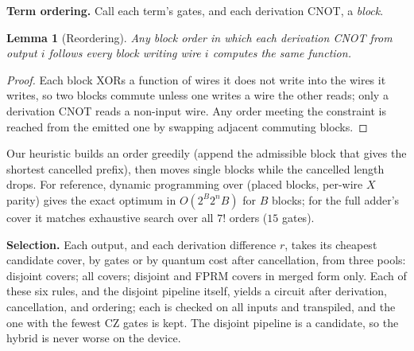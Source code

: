 \documentclass[conference]{IEEEtran}
\theoremstyle{plain}
\newtheorem{lemma}{Lemma}
\begin{document}
\textbf{Term ordering.} Call each term's gates, and each derivation CNOT,
a \emph{block}.
\begin{lemma}[Reordering]
\label{lem:reorder}
Any block order in which each derivation CNOT from output $i$ follows
every block writing wire $i$ computes the same function.
\end{lemma}
\begin{proof}
Each block XORs a function of wires it does not write into the wires it
writes, so two blocks commute unless one writes a wire the other reads;
only a derivation CNOT reads a non-input wire. Any order meeting the
constraint is reached from the emitted one by swapping adjacent
commuting blocks.
\end{proof}
Our heuristic builds an order greedily (append the admissible block that
gives the shortest cancelled prefix), then moves single blocks while the
cancelled length drops. For reference, dynamic programming over
(placed blocks, per-wire $X$ parity) gives the exact optimum in
$O(2^B2^nB)$ for $B$ blocks; for the full adder's cover it matches
exhaustive search over all $7!$ orders ($15$ gates).

\textbf{Selection.} Each output, and each derivation difference $r$,
takes its cheapest candidate cover, by gates or by quantum cost after
cancellation, from three pools: disjoint covers; all covers; disjoint and
FPRM covers in merged form only. Each of these six rules, and the
disjoint pipeline itself, yields a circuit after derivation,
cancellation, and ordering; each is checked on all inputs and
transpiled, and the one with the fewest CZ gates is kept. The disjoint
pipeline is a candidate, so the hybrid is never worse on the device.
\end{document}
